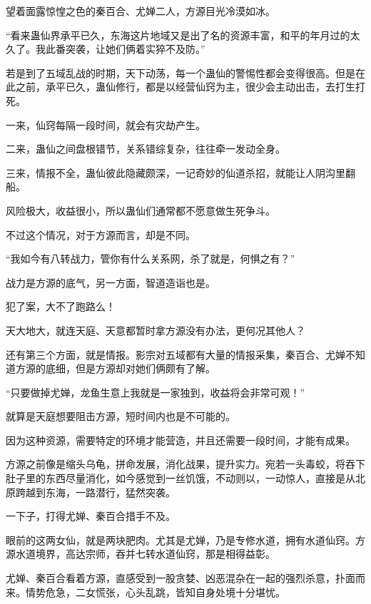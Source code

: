 
\begin{this_body}

望着面露惊惶之色的秦百合、尤婵二人，方源目光冷漠如冰。

“看来蛊仙界承平已久，东海这片地域又是出了名的资源丰富，和平的年月过的太久了。我此番突袭，让她们俩着实猝不及防。”

若是到了五域乱战的时期，天下动荡，每一个蛊仙的警惕性都会变得很高。但是在此之前，承平已久，蛊仙修行，都是以经营仙窍为主，很少会主动出击，去打生打死。

一来，仙窍每隔一段时间，就会有灾劫产生。

二来，蛊仙之间盘根错节，关系错综复杂，往往牵一发动全身。

三来，情报不全，蛊仙彼此隐藏颇深，一记奇妙的仙道杀招，就能让人阴沟里翻船。

风险极大，收益很小，所以蛊仙们通常都不愿意做生死争斗。

不过这个情况，对于方源而言，却是不同。

“我如今有八转战力，管你有什么关系网，杀了就是，何惧之有？”

战力是方源的底气，另一方面，智道造诣也是。

犯了案，大不了跑路么！

天大地大，就连天庭、天意都暂时拿方源没有办法，更何况其他人？

还有第三个方面，就是情报。影宗对五域都有大量的情报采集，秦百合、尤婵不知道方源的底细，但是方源却对她们俩颇有了解。

“只要做掉尤婵，龙鱼生意上我就是一家独到，收益将会非常可观！”

就算是天庭想要阻击方源，短时间内也是不可能的。

因为这种资源，需要特定的环境才能营造，并且还需要一段时间，才能有成果。

方源之前像是缩头乌龟，拼命发展，消化战果，提升实力。宛若一头毒蛟，将吞下肚子里的东西尽量消化，如今感觉到一丝饥饿，不动则以，一动惊人，直接是从北原跨越到东海，一路潜行，猛然突袭。

一下子，打得尤婵、秦百合措手不及。

眼前的这两女仙，就是两块肥肉。尤其是尤婵，乃是专修水道，拥有水道仙窍。方源水道境界，高达宗师，吞并七转水道仙窍，那是相得益彰。

尤婵、秦百合看着方源，直感受到一股贪婪、凶恶混杂在一起的强烈杀意，扑面而来。情势危急，二女慌张，心头乱跳，皆知自身处境十分堪忧。


\end{this_body}

